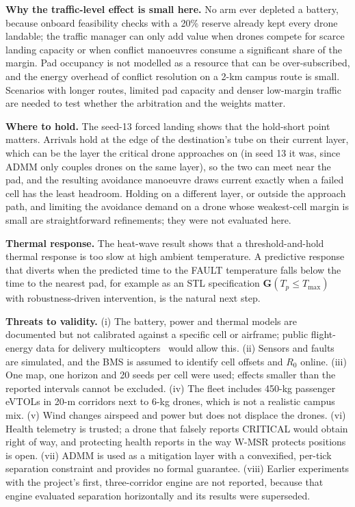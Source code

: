 \documentclass[journal]{IEEEtran}
\begin{document}
\textbf{Why the traffic-level effect is small here.} No arm ever depleted a battery, because onboard feasibility checks with a 20\% reserve already kept every drone landable; the traffic manager can only add value when drones compete for scarce landing capacity or when conflict manoeuvres consume a significant share of the margin. Pad occupancy is not modelled as a resource that can be over-subscribed, and the energy overhead of conflict resolution on a 2-km campus route is small. Scenarios with longer routes, limited pad capacity and denser low-margin traffic are needed to test whether the arbitration and the weights matter.

\textbf{Where to hold.} The seed-13 forced landing shows that the hold-short point matters. Arrivals hold at the edge of the destination's tube on their current layer, which can be the layer the critical drone approaches on (in seed 13 it was, since ADMM only couples drones on the same layer), so the two can meet near the pad, and the resulting avoidance manoeuvre draws current exactly when a failed cell has the least headroom. Holding on a different layer, or outside the approach path, and limiting the avoidance demand on a drone whose weakest-cell margin is small are straightforward refinements; they were not evaluated here.

\textbf{Thermal response.} The heat-wave result shows that a threshold-and-hold thermal response is too slow at high ambient temperature. A predictive response that diverts when the predicted time to the FAULT temperature falls below the time to the nearest pad, for example as an STL specification $\mathbf{G}(T_p \le T_{\max})$ with robustness-driven intervention, is the natural next step.

\textbf{Threats to validity.} (i) The battery, power and thermal models are documented but not calibrated against a specific cell or airframe; public flight-energy data for delivery multicopters~\cite{rodrigues2021dataset} would allow this. (ii) Sensors and faults are simulated, and the BMS is assumed to identify cell offsets and $R_0$ online. (iii) One map, one horizon and 20 seeds per cell were used; effects smaller than the reported intervals cannot be excluded. (iv) The fleet includes 450-kg passenger eVTOLs in 20-m corridors next to 6-kg drones, which is not a realistic campus mix. (v) Wind changes airspeed and power but does not displace the drones. (vi) Health telemetry is trusted; a drone that falsely reports CRITICAL would obtain right of way, and protecting health reports in the way W-MSR protects positions is open. (vii) ADMM is used as a mitigation layer with a convexified, per-tick separation constraint and provides no formal guarantee. (viii) Earlier experiments with the project's first, three-corridor engine are not reported, because that engine evaluated separation horizontally and its results were superseded.
\end{document}
